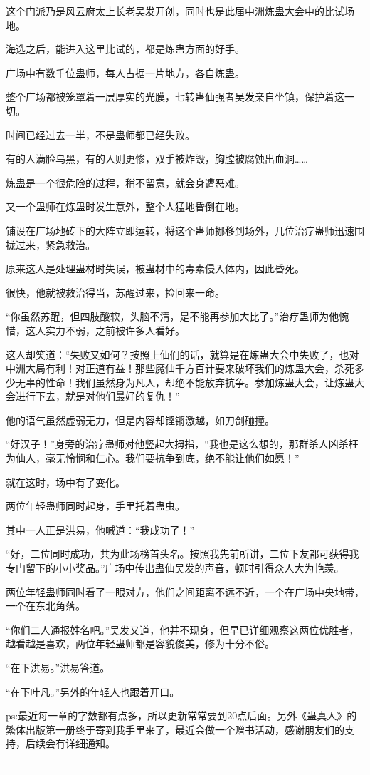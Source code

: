 \begin{this_body}
这个门派乃是风云府太上长老吴发开创，同时也是此届中洲炼蛊大会中的比试场地。

海选之后，能进入这里比试的，都是炼蛊方面的好手。

广场中有数千位蛊师，每人占据一片地方，各自炼蛊。

整个广场都被笼罩着一层厚实的光膜，七转蛊仙强者吴发亲自坐镇，保护着这一切。

时间已经过去一半，不是蛊师都已经失败。

有的人满脸乌黑，有的人则更惨，双手被炸毁，胸膛被腐蚀出血洞……

炼蛊是一个很危险的过程，稍不留意，就会身遭恶难。

又一个蛊师在炼蛊时发生意外，整个人猛地昏倒在地。

铺设在广场地砖下的大阵立即运转，将这个蛊师挪移到场外，几位治疗蛊师迅速围拢过来，紧急救治。

原来这人是处理蛊材时失误，被蛊材中的毒素侵入体内，因此昏死。

很快，他就被救治得当，苏醒过来，捡回来一命。

“你虽然苏醒，但四肢酸软，头脑不清，是不能再参加大比了。”治疗蛊师为他惋惜，这人实力不弱，之前被许多人看好。

这人却笑道：“失败又如何？按照上仙们的话，就算是在炼蛊大会中失败了，也对中洲大局有利！对正道有益！那些魔仙千方百计要来破坏我们的炼蛊大会，杀死多少无辜的性命！我们虽然身为凡人，却绝不能放弃抗争。参加炼蛊大会，让炼蛊大会进行下去，就是对他们最好的复仇！”

他的语气虽然虚弱无力，但是内容却铿锵激越，如刀剑碰撞。

“好汉子！”身旁的治疗蛊师对他竖起大拇指，“我也是这么想的，那群杀人凶杀枉为仙人，毫无怜悯和仁心。我们要抗争到底，绝不能让他们如愿！”

就在这时，场中有了变化。

两位年轻蛊师同时起身，手里托着蛊虫。

其中一人正是洪易，他喊道：“我成功了！”

“好，二位同时成功，共为此场榜首头名。按照我先前所讲，二位下友都可获得我专门留下的小小奖品。”广场中传出蛊仙吴发的声音，顿时引得众人大为艳羡。

两位年轻蛊师同时看了一眼对方，他们之间距离不远不近，一个在广场中央地带，一个在东北角落。

“你们二人通报姓名吧。”吴发又道，他并不现身，但早已详细观察这两位优胜者，越看越是喜欢，两位年轻蛊师都是容貌俊美，修为十分不俗。

“在下洪易。”洪易答道。

“在下叶凡。”另外的年轻人也跟着开口。

ps:最近每一章的字数都有点多，所以更新常常要到20点后面。另外《蛊真人》的繁体出版第一册终于寄到我手里来了，最近会做一个赠书活动，感谢朋友们的支持，后续会有详细通知。

------------

\end{this_body}

